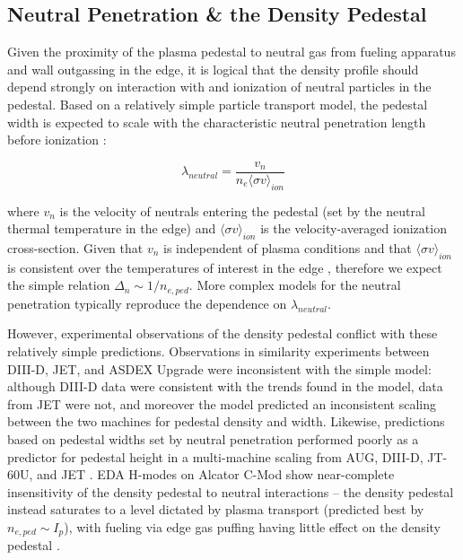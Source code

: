 \subsection{Neutral Penetration \& the Density Pedestal}\label{subsec:mod_neutral}

Given the proximity of the plasma pedestal to neutral gas from fueling apparatus and wall outgassing in the edge, it is logical that the density profile should depend strongly on interaction with and ionization of neutral particles in the pedestal.  Based on a relatively simple particle transport model, the pedestal width is expected to scale with the characteristic neutral penetration length before ionization \cite{Hughes2005,Mahdavi2002}:

\begin{equation}\label{eq:neutralpenetration}
 \lambda_{neutral} = \frac{v_n}{n_e \langle \sigma v \rangle_{ion}}
\end{equation}

\noindent where $v_n$ is the velocity of neutrals entering the pedestal (set by the neutral thermal temperature in the edge) and $\langle \sigma v \rangle_{ion}$ is the velocity-averaged ionization cross-section.  Given that $v_n$ is independent of plasma conditions and that $\langle \sigma v \rangle_{ion}$ is consistent over the temperatures of interest in the edge \cite{Hughes2005}, therefore we expect the simple relation $\Delta_{n} \sim 1/n_{e,ped}$.  More complex models for the neutral penetration typically reproduce the dependence on $\lambda_{neutral}$.

However, experimental observations of the density pedestal conflict with these relatively simple predictions.    Observations in similarity experiments between DIII-D, JET, and ASDEX Upgrade \cite{Beurskens2011} were inconsistent with the simple model: although DIII-D data were consistent with the trends found in the model, data from JET were not, and moreover the model predicted an inconsistent scaling between the two machines for pedestal density and width.  Likewise, predictions based on pedestal widths set by neutral penetration performed poorly as a predictor for pedestal height in a multi-machine scaling from AUG, DIII-D, JT-60U, and JET \cite{Onjun2002}.  EDA H-modes on Alcator C-Mod show near-complete insensitivity of the density pedestal to neutral interactions -- the density pedestal instead saturates to a level dictated by plasma transport (predicted best by $n_{e,ped} \sim I_p$), with fueling via edge gas puffing having little effect on the density pedestal \cite{Hughes2006,Hughes2007}.

